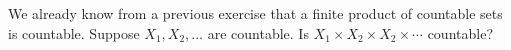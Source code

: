   We already know from a previous exercise that a finite
 product of countable sets is countable. Suppose $X_1, X_2, \ldots$
 are countable. Is $X_1 \times X_2 \times X_2 \times \cdots$
 countable?
